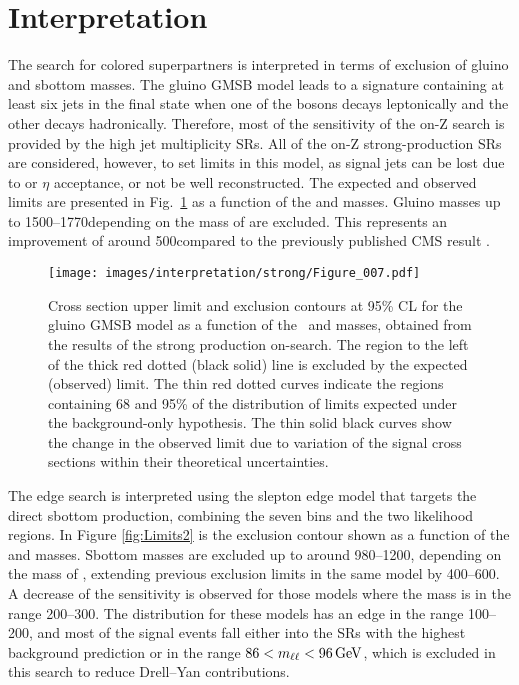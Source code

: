 \section{Interpretation}
\noindent\justify
The search for colored superpartners is interpreted in terms of exclusion of gluino and sbottom masses. 
The gluino GMSB model leads to a signature containing at least six jets in the final state when one of the \PZ bosons decays leptonically and the other decays hadronically.  
Therefore, most of the sensitivity of the on-Z search is provided by the high jet multiplicity SRs.
All of the on-Z strong-production SRs are considered, however, to set limits in this model, as signal jets can be lost due to \pt or $\eta$ acceptance, or not be well reconstructed.
The expected and observed limits are presented in Fig.~\ref{fig:Limits1} as a function of the \gluino  and \firstchi masses.
Gluino masses up to 1500--1770\GeV depending on the mass of \firstchi are excluded.
This represents an improvement of around 500\GeV compared to the previously published CMS result \cite{Khachatryan:2015lwa}.
\begin{figure}[!hb]
 \centering
   \texttt{[image: images/interpretation/strong/Figure\_007.pdf]}
   \caption{\label{fig:Limits1}
Cross section upper limit and exclusion contours at 95\% CL for the gluino GMSB model as a function of the \gluino~and \firstchi masses, obtained from the results of the strong production on-\PZ search.
The region to the left of the thick red dotted (black solid) line is excluded by the expected (observed) limit.
The thin red dotted curves indicate the regions containing 68 and 95\% of the distribution of limits expected under the background-only hypothesis. 
The thin solid black curves show the change in the observed limit due to variation of the signal cross sections within their theoretical uncertainties.}
\end{figure}
\newpara
\noindent\justify
The edge search is interpreted using the slepton edge model that targets the direct sbottom production, combining the seven \mll bins and the two \ttbar likelihood regions.
In Figure \ref{fig:Limits2} is the exclusion contour shown as a function of the \sbottom and \secondchi masses. 
Sbottom masses are excluded up to around 980--1200\GeV, depending on the mass of \secondchi, extending previous exclusion limits in the same model by 400--600\GeV.
A decrease of the sensitivity is observed for those models where the \secondchi mass is in the range 200--300\GeV.
The \mll distribution for these models has an edge in the range 100--200\GeV, and most of the signal events fall either into the SRs with the highest background prediction or in the range $86 < m_{\ell\ell} < 96\,\text{Ge\hspace{-.08em}V}$, which is excluded in this search to reduce Drell--Yan contributions.
